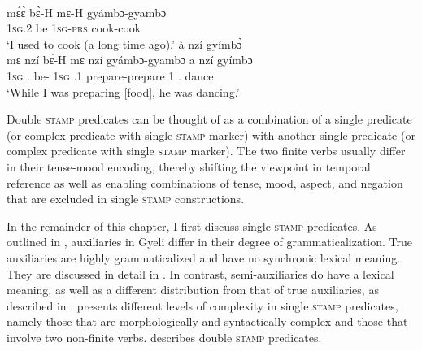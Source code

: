 \ea\label{DobPred}
\ea \label{DobPred1}
   \\
          {\db}mɛ́ɛ̀ bɛ̀-H mɛ-H gyámbɔ-gyambɔ \\
              {\db}1\textsc{sg}.{\PST}2 be 1\textsc{sg}-\textsc{prs} cook-cook\\
    \trans `I used to cook (a long time ago).'
\ex\label{DobPred2}
  à nzí gyímbɔ̀  \\
 {\db}mɛ nzí bɛ̀-H mɛ nzí gyámbɔ-gyambɔ a nzí gyímbɔ  \\
              {\db}1\textsc{sg} {\PROG}.{\PST} be-{\R} 1\textsc{sg} {\PROG}.{\PST}1 prepare-prepare 1 {\PROG}.{\PST} dance\\
    \trans `While I was preparing [food], he was dancing.'
\z
\z

Double \textsc{stamp} predicates can be thought of as a combination of a single predicate (or complex predicate with single \textsc{stamp} marker)  with another single predicate (or complex predicate with single \textsc{stamp} marker). The two finite verbs usually differ in their tense-mood encoding, thereby shifting the viewpoint in temporal reference as well as enabling combinations of tense, mood, aspect, and negation that are excluded in single \textsc{stamp} constructions.

In the remainder of this chapter, I first discuss single \textsc{stamp} predicates. As outlined in , auxiliaries in Gyeli differ in their degree of grammaticalization. True auxiliaries are highly grammaticalized and have no synchronic lexical meaning. They are discussed in detail in . In contrast, semi-auxiliaries do have a  lexical meaning, as well as a different distribution from that of true auxiliaries, as described in .  presents different levels of complexity in single \textsc{stamp} predicates, namely those that are morphologically and syntactically complex and those that involve two non-finite verbs.  describes double \textsc{stamp} predicates.


















